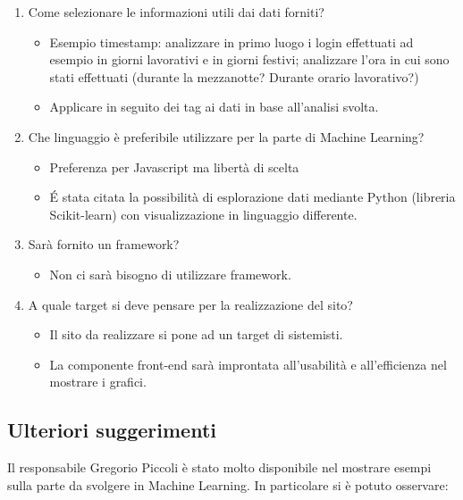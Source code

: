 \begin{enumerate}
	\item Come selezionare le informazioni utili dai dati forniti?
	\begin{itemize}
		\item Esempio timestamp: analizzare in primo luogo i login effettuati ad esempio in giorni lavorativi e in giorni festivi; analizzare l'ora in cui sono stati effettuati (durante la mezzanotte? Durante orario lavorativo?)
		\item Applicare in seguito dei tag ai dati in base all'analisi svolta.
	\end{itemize}

	\item Che linguaggio è preferibile utilizzare per la parte di Machine Learning?
	\begin{itemize}
		\item Preferenza per Javascript ma libertà di scelta
		\item \'E stata citata la possibilità di esplorazione dati mediante Python (libreria Scikit-learn) con visualizzazione in linguaggio differente.
	\end{itemize}

	\item Sarà fornito un framework?
	\begin{itemize}
		\item Non ci sarà bisogno di utilizzare framework.
	\end{itemize}

	\item A quale target si deve pensare per la realizzazione del sito?
	\begin{itemize}
		\item Il sito da realizzare si pone ad un target di sistemisti.
		\item La componente front-end sarà improntata all'usabilità e all'efficienza nel mostrare i grafici.
		\end{itemize}

\end{enumerate}

\subsection{Ulteriori suggerimenti}

Il responsabile Gregorio Piccoli è stato molto disponibile nel mostrare esempi sulla parte da svolgere in Machine Learning. In particolare si è potuto osservare:

